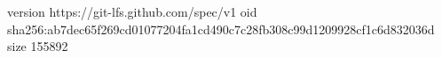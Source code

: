 version https://git-lfs.github.com/spec/v1
oid sha256:ab7dec65f269cd01077204fa1cd490c7c28fb308c99d1209928cf1c6d832036d
size 155892
